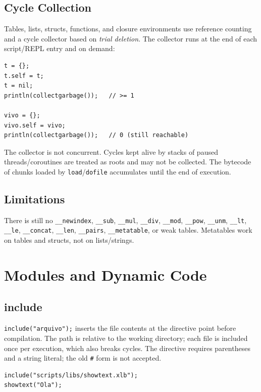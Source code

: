 \documentclass[11pt,a4paper,oneside]{report}
\newcommand{\code}[1]{\texttt{#1}}
\begin{document}
\section{Cycle Collection}
Tables, lists, structs, functions, and closure environments use reference
counting and a cycle collector based on \emph{trial deletion}. The
collector runs at the end of each script/REPL entry and on demand:

\begin{lstlisting}
t = {};
t.self = t;
t = nil;
println(collectgarbage());   // >= 1

vivo = {};
vivo.self = vivo;
println(collectgarbage());   // 0 (still reachable)
\end{lstlisting}

The collector is not concurrent. Cycles kept alive by stacks of paused
threads/coroutines are treated as roots and may not be collected. The
bytecode of chunks loaded by \code{load}/\code{dofile} accumulates until
the end of execution.

\section{Limitations}
There is still no \code{\_\_newindex}, \code{\_\_sub},
\code{\_\_mul}, \code{\_\_div}, \code{\_\_mod}, \code{\_\_pow},
\code{\_\_unm}, \code{\_\_lt}, \code{\_\_le}, \code{\_\_concat},
\code{\_\_len}, \code{\_\_pairs}, \code{\_\_metatable}, or weak
tables. Metatables work on tables and structs, not on lists/strings.

\chapter{Modules and Dynamic Code}
\label{cap:modulos}

\section{include}
\code{include("arquivo");} inserts the file contents at the directive
point before compilation. The path is relative to the working directory;
each file is included once per execution, which also breaks cycles. The
directive requires parentheses and a string literal; the old \code{\#}
form is not accepted.

\begin{lstlisting}
include("scripts/libs/showtext.xlb");
showtext("Ola");
\end{lstlisting}
\end{document}
